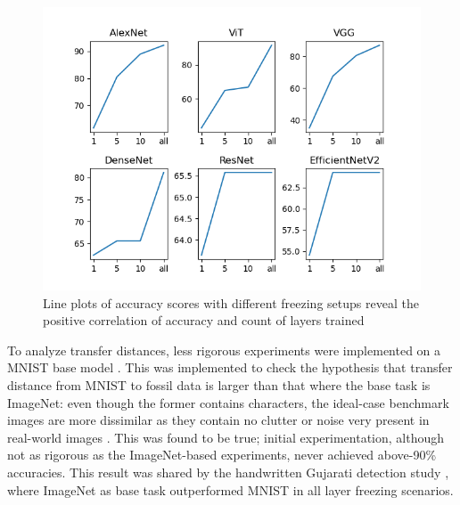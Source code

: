 \documentclass{article}
\begin{document}
\begin{figure}[h]
    \centering
    \includegraphics*[scale=0.8]{../images/accuracy_against_freezing.png}
    \caption{Line plots of accuracy scores with different freezing setups reveal the positive correlation of accuracy and count of layers trained}
    \label{image:accuracy_vs_freezing}
\end{figure}

To analyze transfer distances, less rigorous experiments were implemented on a MNIST base model \cite{jamilemnist}.
This was implemented to check the hypothesis that transfer distance from MNIST to fossil data is larger than that where 
the base task is ImageNet: even though the former contains characters, the ideal-case benchmark images are more dissimilar 
as they contain no clutter or noise very present in real-world images \cite{alexnet}. This was found to be true; 
initial experimentation, although not as rigorous as the ImageNet-based experiments, never achieved above-90\% accuracies.
This result was shared by the handwritten Gujarati detection study \cite{8goelGujarati2023}, where ImageNet as base task 
outperformed MNIST in all layer freezing scenarios. 
\end{document}
